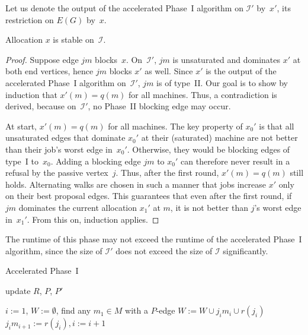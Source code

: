 \documentclass{llncs}
\begin{document}
Let us denote the output of the accelerated Phase~I algorithm on $\mathcal{I}'$ by~$x'$, its restriction on $E(G)$ by~$x$.

\begin{claim}
	Allocation $x$ is stable on~$\mathcal{I}$.
\end{claim}

\begin{proof}
	Suppose edge $jm$ blocks~$x$. On~$\mathcal{I}'$, $jm$ is unsaturated and dominates $x'$ at both end vertices, hence $jm$ blocks $x'$ as well. Since $x'$ is the output of the accelerated Phase~I algorithm on~$\mathcal{I}'$, $jm$ is of type~II. Our goal is to show by induction that $x'(m) = q(m)$ for all machines. Thus, a contradiction is derived, because on~$\mathcal{I}'$, no Phase~II blocking edge may occur.

	At start, $x'(m) = q(m)$ for all machines. The key property of $x_0'$ is that all unsaturated edges that dominate $x_0'$ at their (saturated) machine are not better than their job's worst edge in~$x_0'$. Otherwise, they would be blocking edges of type~I to~$x_0$. Adding a blocking edge $jm$ to $x_0'$ can therefore never result in a refusal by the passive vertex~$j$. Thus, after the first round, $x'(m) = q(m)$ still holds. Alternating walks are chosen in such a manner that jobs increase $x'$ only on their best proposal edges. This guarantees that even after the first round, if $jm$ dominates the current allocation $x_1'$ at $m$, it is not better than $j$'s worst edge in~$x_1'$. From this on, induction applies.
\end{proof}

The runtime of this phase may not exceed the runtime of the accelerated Phase~I algorithm, since the size of $\mathcal{I}'$ does not exceed the size of $\mathcal{I}$ significantly.

\begin{algorithm}[H]
\renewcommand{\thealgorithm}{}
\label{alg:acc:phI}
\caption{Accelerated Phase~I}
\begin{algorithmic}
		\State {}
			\State {}
		\Else
			\State {}
		\EndIf		
	\State update $R$, $P$, $P'$
	\EndWhile
\end{algorithmic}
\end{algorithm}

\begin{algorithmic}[]
	\label{FindWalk}
		\State $i := 1$, $W := \emptyset$, find any $m_1 \in M$ with a $P$-edge
			\State $W := W \cup j_i m_i \cup r(j_i)$
			\State $j_i m_{i+1} := r(j_i), i := i+1$
		\EndWhile
	\EndProcedure
\end{algorithmic}
\vline
\end{document}
